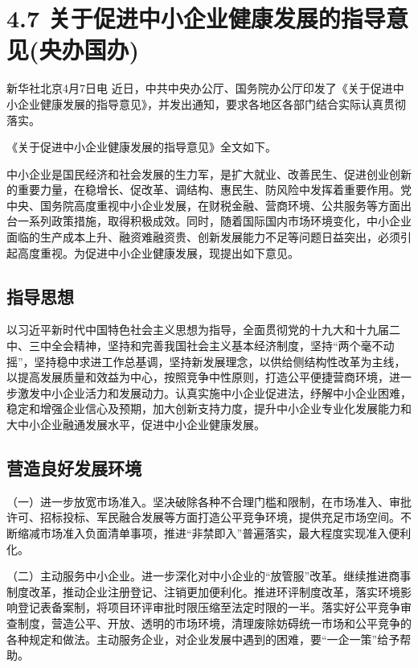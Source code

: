 \chapter{4.7 关于促进中小企业健康发展的指导意见(央办国办)} %

\noindent 新华社北京4月7日电 近日，中共中央办公厅、国务院办公厅印发了《关于促进中小企业健康发展的指导意见》，并发出通知，要求各地区各部门结合实际认真贯彻落实。

\noindent 《关于促进中小企业健康发展的指导意见》全文如下。

中小企业是国民经济和社会发展的生力军，是扩大就业、改善民生、促进创业创新的重要力量，在稳增长、促改革、调结构、惠民生、防风险中发挥着重要作用。党中央、国务院高度重视中小企业发展，在财税金融、营商环境、公共服务等方面出台一系列政策措施，取得积极成效。同时，随着国际国内市场环境变化，中小企业面临的生产成本上升、融资难融资贵、创新发展能力不足等问题日益突出，必须引起高度重视。为促进中小企业健康发展，现提出如下意见。

\section{指导思想}

以习近平新时代中国特色社会主义思想为指导，全面贯彻党的十九大和十九届二中、三中全会精神，坚持和完善我国社会主义基本经济制度，坚持“两个毫不动摇”，坚持稳中求进工作总基调，坚持新发展理念，以供给侧结构性改革为主线，以提高发展质量和效益为中心，按照竞争中性原则，打造公平便捷营商环境，进一步激发中小企业活力和发展动力。认真实施中小企业促进法，纾解中小企业困难，稳定和增强企业信心及预期，加大创新支持力度，提升中小企业专业化发展能力和大中小企业融通发展水平，促进中小企业健康发展。

\section{营造良好发展环境}

（一）进一步放宽市场准入。坚决破除各种不合理门槛和限制，在市场准入、审批许可、招标投标、军民融合发展等方面打造公平竞争环境，提供充足市场空间。不断缩减市场准入负面清单事项，推进“非禁即入”普遍落实，最大程度实现准入便利化。

（二）主动服务中小企业。进一步深化对中小企业的“放管服”改革。继续推进商事制度改革，推动企业注册登记、注销更加便利化。推进环评制度改革，落实环境影响登记表备案制，将项目环评审批时限压缩至法定时限的一半。落实好公平竞争审查制度，营造公平、开放、透明的市场环境，清理废除妨碍统一市场和公平竞争的各种规定和做法。主动服务企业，对企业发展中遇到的困难，要“一企一策”给予帮助。

